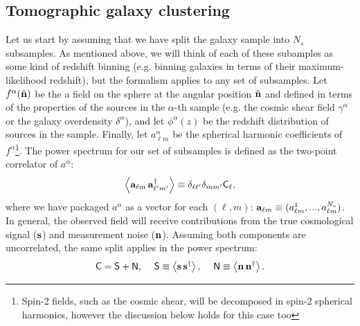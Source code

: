\documentclass[twocolumn,amsfont,amssymb,amsmath, showpacs,balancelastpage, nofootinbib]{revtex4-1}
\newcommand{\nv}{\hat{\bf n}}
\begin{document}
  \subsection{Tomographic galaxy clustering}\label{ssec:method.tomographic}
    Let us start by assuming that we have split the galaxy sample into $N_s$ subsamples. As mentioned above, we will think of each of these subamples as some kind of redshift binning (e.g. binning galaxies in terms of their maximum-likelihood redshift), but the formalism applies to any set of subsamples. Let $f^\alpha(\nv)$ be the a field on the sphere at the angular position $\nv$ and defined in terms of the properties of the sources in the $\alpha$-th sample (e.g. the cosmic shear field $\gamma^\alpha$ or the galaxy overdensity $\delta^\alpha$), and let $\phi^\alpha(z)$ be the redshift distribution of sources in the sample. Finally, let $a^\alpha_{\ell m}$ be the spherical harmonic coefficients of $f^\alpha$\footnote{Spin-2 fields, such as the cosmic shear, will be decomposed in spin-2 spherical harmonics, however the discussion below holds for this case too}. The power spectrum for our set of subsamples is defined as the two-point correlator of $a^\alpha$:
    \begin{equation}
      \left\langle {\bf a}_{\ell m}\,{\bf a}^\dag_{\ell' m'} \right\rangle\equiv\delta_{\ell\ell'}\delta_{mm'}{\sf C}_\ell,
    \end{equation}
    where we have packaged $a^\alpha$ as a vector for each $(\ell,m)$: ${\bf a}_{\ell m}\equiv(a^1_{\ell m},...,a^{N_s}_{\ell m})$. In general, the observed field will receive contributions from the true cosmological signal (${\bf s}$) and measurement noise (${\bf n}$). Assuming both components are uncorrelated, the same split applies in the power spectrum:
    \begin{equation}
      {\sf C}={\sf S}+{\sf N},\hspace{12pt}
      {\sf S}\equiv\left\langle{\bf s}\,{\bf s}^\dag\right\rangle, \hspace{12pt}
      {\sf N}\equiv\left\langle{\bf n}\,{\bf n}^\dag\right\rangle.
    \end{equation}
  
\end{document}

